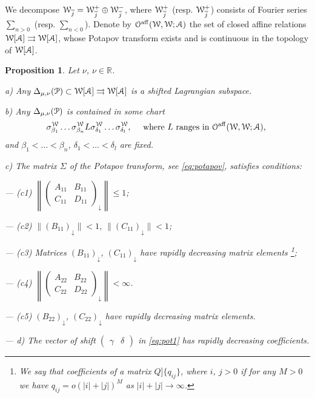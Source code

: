 \documentclass[]{amsart}
\newtheorem{proposition}[theorem]{Proposition}
\def\aff{\mathrm{aff}}
\def\le{\leqslant}
\def\cA{\EuScript A}
\def\cO{\EuScript O}
\def\cP{\EuScript P}
\def\cW{\EuScript W}
\def\R {{\mathbb R }}
\def\ov{\overline}
\def\sm{\smallskip}
\begin{document}
We decompose $\cW_{\ov j}=\cW_{\ov j}^+\oplus \cW_{\ov j}^-$, 
 where $\cW_{\ov j}^+$ (resp. $\cW_{\ov j}^+$) consists of 
Fourier series
$\sum_{n>0}$ (resp. $\sum_{n<0}$). Denote by $\cO^\aff(\cW, \cW;\cA)$
 the set
of closed affine relations $\cW[\cA]\tto\cW[\cA]$, whose Potapov transform
exists  and is continuous in the topology of $\cW[\cA]$.





\begin{proposition}
	\label{pr:long}
	 Let $\nu$, $\nu\in\R$.
	
	\sm 
	
	{\rm a)}
	Any $\Delta_{\mu,\nu}(\cP)\subset \cW[\cA]\tto \cW[\cA]$
	is a shifted Lagrangian  subspace.
	
	\sm
	
{\rm b)}   
Any $\Delta_{\mu,\nu}(\cP)$
is contained in some chart	
$$
\sigma_{\beta_1}^\cW\dots \sigma_{\beta_n}^\cW 
L
\sigma_{\delta_1}^\cW\dots \sigma_{\delta_l}^\cW,
\quad\text{ where $L$ ranges in  $\cO^\aff(\cW,\cW;\cA)$,
} 
$$
and 
$\beta_1<\dots<\beta_n$, 
$\delta_1<\dots<\delta_l$ are fixed.

\sm 

{\rm c)} The matrix $\Sigma$ of the Potapov transform,
 see \eqref{eq:potapov},
satisfies conditions:

\sm 

--- {\rm (c1)} $\left\|\begin{pmatrix}
	A_{11}&B_{11}\\ C_{11}& D_{11}
\end{pmatrix}_\downarrow \right\|\le 1$;


\sm 


--- {\rm (c2)} $\|(B_{11})_\downarrow \|<1$,  $\|(C_{11})_\downarrow \|<1$;

\sm 

--- {\rm (c3)} Matrices  $(B_{11})_\downarrow$,  $(C_{11})_\downarrow$
have rapidly decreasing matrix elements%
\footnote{We say that coefficients of a matrix $Q]\{q_{ij}\}$, where $i$, $j>0$
if for any $M>0$ we have $q_{ij}=o(|i|+|j|)^M$ as
$|i|+|j|\to \infty$.};

\sm 


--- {\rm  (c4)} $\left\|\begin{pmatrix}
	A_{22}&B_{22}\\ C_{22}& D_{22}
\end{pmatrix}_\downarrow\right\|<\infty $. 


\sm 

--- {\rm (c5)} $(B_{22})_\downarrow $,  $(C_{22})_\downarrow$
have rapidly decreasing matrix elements.

\sm

--- {\rm d)} The vector of shift 
$\begin{pmatrix}\gamma&\delta \end{pmatrix}$ in
\eqref{eq:pot1} has rapidly decreasing coefficients. 
\end{proposition} 
\end{document}
